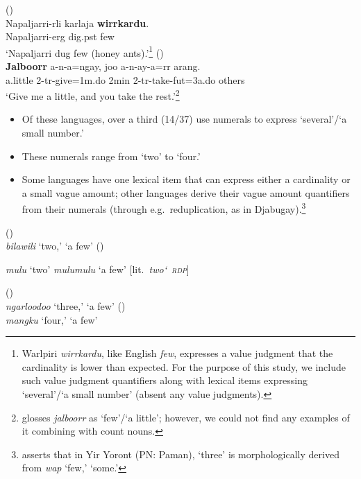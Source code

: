 \documentclass{article}
\begin{document}
\newpage
\begin{exe}
   (\citealt[9]{bowler17})\\
  \gll Napaljarri-rli karlaja \textbf{wirrkardu}.\\
  Napaljarri-{\sc erg} dig.{\sc pst} few\\
  \glt `Napaljarri dug few (honey ants).'\footnote{Warlpiri \textit{wirrkardu}, like English \textit{few}, expresses a value judgment that the cardinality is lower than expected. For the purpose of this study, we include such value judgment quantifiers along with lexical items expressing `several'/`a small number' (absent any value judgments).}
   (\citealt[271]{bowern12})\\  
  \gll \textbf{Jalboorr} a-n-a=ngay, joo a-n-ay-a=rr arang.\\
  a.little 2-{\sc tr}-give=1{\sc m.do} 2{\sc min} 2-{\sc tr}-take-{\sc fut}=3{\sc a.do} others\\
  \glt `Give me a little, and you take the rest.'\footnote{\cite{bowern12} glosses \textit{jalboorr} as `few'/`a little'; however, we could not find any examples of it combining with count nouns.}
\end{exe}

\begin{itemize}
\item Of these languages, over a third (14/37) use numerals to express `several'/`a small number.' 
\item These numerals range from `two'  to `four.'
\item Some languages have one lexical item that can express either a cardinality or a small vague amount; other languages derive their vague amount quantifiers from their numerals (through e.g.\ reduplication, as in Djabugay).\footnote{\citet[51]{alpher73} asserts that in Yir Yoront (PN: Paman), \textit{} `three' is morphologically derived from \textit{wap} `few,' `some.'}
\end{itemize}

\begin{exe}
   (\citealt[9]{waters83})\\
  {\it bilawili} `two,' `a few'
   (\citealt[87]{patz91})
  \begin{xlist}
    \ex \textit{mulu} `two'
    \ex \textit{mulumulu} `a few' [lit.\ \textit{two\char`~\textsc{rdp}}]
  \end{xlist}
   (\citealt[149]{mcgregor90})\\
  \textit{ngarloodoo} `three,' `a few'
   (\citealt[27,82]{thompson88})\\
  {\it mangku} `four,' `a few'
\end{exe}
\end{document}
